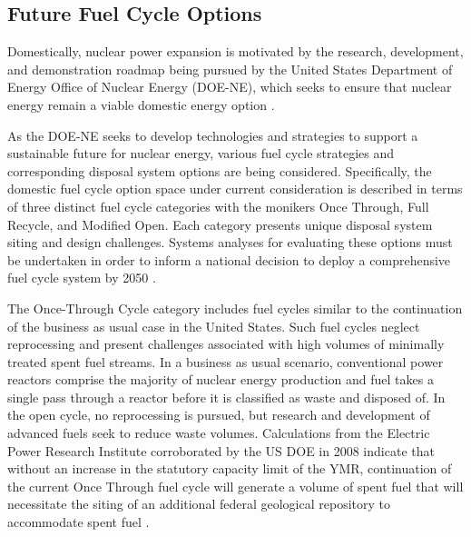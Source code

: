 \subsection{Future Fuel Cycle Options}


Domestically, nuclear power expansion is motivated by the research, development, 
and demonstration roadmap being pursued by the United States Department of 
Energy Office of Nuclear Energy (DOE-NE), which seeks to ensure that nuclear 
energy remain a viable domestic energy option \cite{doe_nuclear_2010}. 


As the DOE-NE seeks to develop technologies and strategies to support a 
sustainable future for nuclear energy, various fuel cycle strategies and 
corresponding disposal system options are being considered.  Specifically, the 
domestic fuel cycle option space under current consideration is described in 
terms of three distinct fuel cycle categories with the monikers Once Through, 
Full Recycle, and Modified Open. Each category presents unique disposal system 
siting and design challenges. Systems analyses for evaluating these options must 
be undertaken in order to inform a national decision to deploy a comprehensive 
fuel cycle system by 2050 \cite{doe_nuclear_2010}. 


The Once-Through Cycle category includes fuel cycles similar to the continuation 
of the business as usual case in the United States.
Such fuel cycles neglect reprocessing and present challenges associated with 
high volumes of minimally treated spent fuel streams.  In a business as usual 
scenario, conventional power reactors comprise the majority of nuclear energy 
production and fuel takes a single pass through a reactor before it is 
classified as waste and disposed of. In the open cycle, no reprocessing is 
pursued, but research and development of advanced fuels seek to reduce waste 
volumes. Calculations from the Electric Power Research Institute corroborated by 
the \gls{US} \gls{DOE} in 2008 indicate that without an increase in the statutory 
capacity limit of the \gls{YMR}, continuation of the current Once Through fuel 
cycle will generate a volume of spent fuel that will necessitate
the siting of an additional federal geological repository to accommodate spent 
fuel \cite{kessler_room_2006, doe_report_2008}. 

